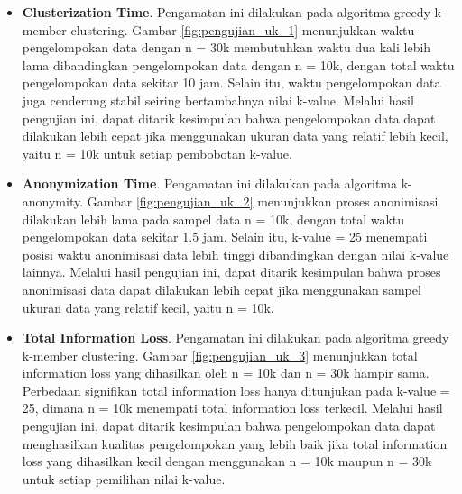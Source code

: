 \begin{itemize}

\item \textbf{Clusterization Time}. Pengamatan ini dilakukan pada algoritma greedy k-member clustering. Gambar \ref{fig:pengujian_uk_1} menunjukkan waktu pengelompokan data dengan n = 30k membutuhkan waktu dua kali lebih lama dibandingkan pengelompokan data dengan n = 10k, dengan total waktu pengelompokan data sekitar 10 jam. Selain itu, waktu pengelompokan data juga cenderung stabil seiring bertambahnya nilai k-value. Melalui hasil pengujian ini, dapat ditarik kesimpulan bahwa pengelompokan data dapat dilakukan lebih cepat jika menggunakan ukuran data yang relatif lebih kecil, yaitu n = 10k untuk setiap pembobotan k-value.

\item \textbf{Anonymization Time}. Pengamatan ini dilakukan pada algoritma k-anonymity. Gambar \ref{fig:pengujian_uk_2} menunjukkan proses anonimisasi dilakukan lebih lama pada sampel data n = 10k, dengan total waktu pengelompokan data sekitar 1.5 jam. Selain itu, k-value = 25 menempati posisi waktu anonimisasi data lebih tinggi dibandingkan dengan nilai k-value lainnya. Melalui hasil pengujian ini, dapat ditarik kesimpulan bahwa proses anonimisasi data dapat dilakukan lebih cepat jika menggunakan sampel ukuran data yang relatif kecil, yaitu n = 10k.

\item \textbf{Total Information Loss}. Pengamatan ini dilakukan pada algoritma greedy k-member clustering. Gambar \ref{fig:pengujian_uk_3} menunjukkan total information loss yang dihasilkan oleh n = 10k dan n = 30k hampir sama. Perbedaan signifikan total information loss hanya ditunjukan pada k-value = 25, dimana n = 10k menempati total information loss terkecil. Melalui hasil pengujian ini, dapat ditarik kesimpulan bahwa pengelompokan data dapat menghasilkan kualitas pengelompokan yang lebih baik jika total information loss yang dihasilkan kecil dengan menggunakan n = 10k maupun n = 30k untuk setiap pemilihan nilai k-value.
\end{itemize}

